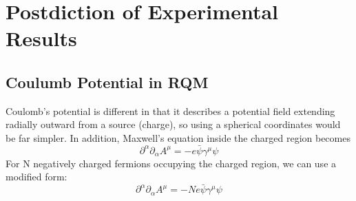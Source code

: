 \chapter{Postdiction of Experimental Results}
\section{Coulumb Potential in RQM}
Coulomb's potential is different in that it describes a potential field extending radially outward from a source (charge), so using a spherical coordinates would be far simpler. In addition, Maxwell's equation inside the charged region becomes
\begin{equation}\partial^{\alpha} \partial_{\alpha} A^{\mu}=-e \bar{\psi} \gamma^{\mu} \psi\end{equation}
For N negatively charged fermions occupying the charged region, we can use a modified form:
\begin{equation}\partial^{\alpha} \partial_{\alpha} A^{\mu}=-N e \bar{\psi} \gamma^{\mu} \psi\end{equation}

